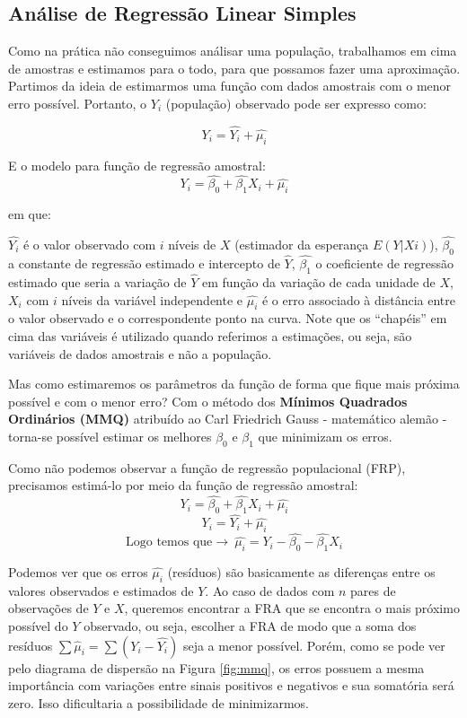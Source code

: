 \documentclass[
]{book}
\begin{document}
\hypertarget{reglin}{%
\subsection{Análise de Regressão Linear Simples}\label{reglin}}

Como na prática não conseguimos análisar uma população, trabalhamos em cima de amostras e estimamos para o todo, para que possamos fazer uma aproximação. Partimos da ideia de estimarmos uma função com dados amostrais com o menor erro possível. Portanto, o \(Y_i\) (população) observado pode ser expresso como:

\begin{equation}
    Y_i=\hat{Y_i}+\hat{\mu_i}
    \label{eq:frp}
\end{equation}

E o modelo para função de regressão amostral:
\begin{equation}
    Y_i=\hat{\beta_0}+\hat{\beta_1}X_i+\hat{\mu_i}
    \label{eq:fra}
\end{equation}

em que:

\(\hat{Y_i}\) é o valor observado com \(i\) níveis de \(X\) (estimador da esperança \(E(Y|Xi)\)), \(\hat{\beta_0}\) a constante de regressão estimado e intercepto de \(\hat{Y}\), \(\hat{\beta_1}\) o coeficiente de regressão estimado que seria a variação de \(\hat{Y}\) em função da variação de cada unidade de \(X\), \(X_i\) com \(i\) níveis da variável independente e \(\hat{\mu_i}\) é o erro associado à distância entre o valor observado e o correspondente ponto na curva. Note que os ``chapéis'' em cima das variáveis é utilizado quando referimos a estimações, ou seja, são variáveis de dados amostrais e não a população.

Mas como estimaremos os parâmetros da função de forma que fique mais próxima possível e com o menor erro? Com o método dos \textbf{Mínimos Quadrados Ordinários (MMQ)} atribuído ao Carl Friedrich Gauss - matemático alemão - torna-se possível estimar os melhores \(\beta_0\) e \(\beta_1\) que minimizam os erros.

Como não podemos observar a função de regressão populacional (FRP), precisamos estimá-lo por meio da função de regressão amostral:
\[Y_i=\hat{\beta_0}+\hat{\beta_1}X_i+\hat{\mu_i} \]
\[Y_i=\hat{Y_i}+\hat{\mu_i}\]
\[\mbox{Logo temos que} \rightarrow \ \hat{\mu_i}=Y_i-\hat{\beta_0}-\hat{\beta_1} X_i\]

Podemos ver que os erros \(\hat{\mu_i}\) (resíduos) são basicamente as diferenças entre os valores observados e estimados de \(Y\). Ao caso de dados com \(n\) pares de observações de \(Y\) e \(X\), queremos encontrar a FRA que se encontra o mais próximo possível do \(Y\) observado, ou seja, escolher a
FRA de modo que a soma dos resíduos \(\sum \hat{\mu}_i=\sum(Y_i-\hat{Y_i})\) seja a menor possível. Porém, como se pode ver pelo diagrama de dispersão na Figura \ref{fig:mmq}, os erros possuem a mesma importância com variações entre sinais positivos e negativos e sua somatória será zero. Isso dificultaria a possibilidade de minimizarmos.
\end{document}
